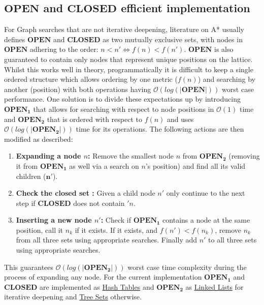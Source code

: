 \documentclass[conference]{IEEEtran}
\begin{document}
\subsection{$\mathbf{OPEN}$ and $\mathbf{CLOSED}$ efficient implementation}
\label{openclosed}
For Graph searches that are not iterative deepening, literature on A* usually defines $\mathbf{OPEN}$ and $\mathbf{CLOSED}$ as two mutually exclusive sets, with nodes in $\mathbf{OPEN}$ adhering to the order: $n < n' \iff f(n) < f(n')$. $\mathbf{OPEN}$ is also guaranteed to contain only nodes that represent unique positions on the lattice. Whilst this works well in theory, programmatically it is difficult to keep a single ordered structure which allows ordering by one metric ($f(n)$) and searching by another (position) with both operations having $\mathcal{O}(log(|\mathbf{OPEN}|))$ worst case performance. One solution is to divide these expectations up by introducing $\mathbf{OPEN_1}$ that allows for searching with respect to node positions in $\mathcal{O}(1)$ time and $\mathbf{OPEN_2}$ that is ordered with respect to $f(n)$ and uses $\mathcal{O}(log(|\mathbf{OPEN_2}|))$ time for its operations. The following actions are then modified as described:
\begin{enumerate}
\label{modSteps}
    \item \textbf{Expanding a node $n$:} Remove the smallest node $n$ from $\mathbf{OPEN_2}$ (removing it from $\mathbf{OPEN_1}$ as well via a search on $n$'s position) and find all its valid children ($\mathbf{n'}$).
    \item \textbf{Check the closed set :} Given a child node $n'$ only continue to the next step if $\mathbf{CLOSED}$ does not contain $'n$.
    \item \textbf{Inserting a new node $n'$:} Check if $\mathbf{OPEN_1}$ contains a node at the same position, call it $n_k$ if it exists. If it exists, and $f(n') < f(n_k)$, remove $n_k$ from all three sets using appropriate searches. Finally add $n'$ to all three sets using appropriate searches.
\end{enumerate}
This guarantees $\mathcal{O}(log(|\mathbf{OPEN_2}|))$ worst case time complexity during the process of expanding any node. For the current implementation $\mathbf{OPEN_1}$ and $\mathbf{CLOSED}$ are implemented as \href{https://docs.oracle.com/javase/8/docs/api/java/util/HashMap.html}{Hash Tables} and $\mathbf{OPEN_2}$ as  \href{https://docs.oracle.com/javase/7/docs/api/java/util/LinkedList.html}{Linked Lists} for iterative deepening and  \href{https://docs.oracle.com/javase/10/docs/api/java/util/TreeSet.html}{Tree Sets} otherwise.
\end{document}
